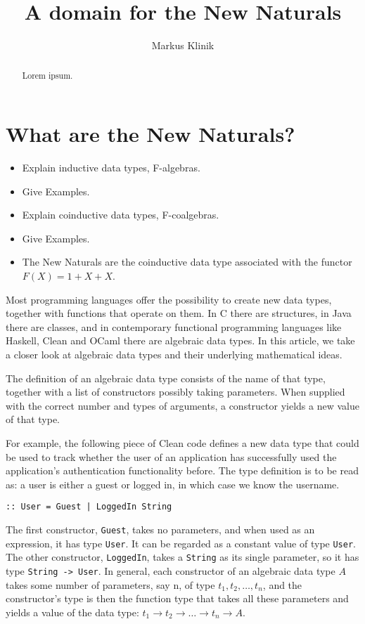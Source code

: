 \documentclass[a4paper]{article}
\newcommand{\arr}{\rightarrow}
\begin{document}
\title{A domain for the New Naturals}
\author{Markus Klinik}
\maketitle

\begin{abstract}
Lorem ipsum.
\end{abstract}

\section{What are the New Naturals?}

\begin{itemize}
\item Explain inductive data types, F-algebras.
\item Give Examples.
\item Explain coinductive data types, F-coalgebras.
\item Give Examples.
\item The New Naturals are the coinductive data type associated with the
functor $F(X) = 1 + X + X$.
\end{itemize}

Most programming languages offer the possibility to create new data types,
together with functions that operate on them.  In C there are structures, in
Java there are classes, and in contemporary functional programming languages
like Haskell, Clean and OCaml there are algebraic data types.  In this article,
we take a closer look at algebraic data types and their underlying mathematical
ideas.

The definition of an algebraic data type consists of the name of that type,
together with a list of constructors possibly taking parameters.  When supplied
with the correct number and types of arguments, a constructor yields a new
value of that type.

For example, the following piece of Clean code defines a new data type that
could be used to track whether the user of an application has successfully used
the application's authentication functionality before.  The type definition is
to be read as: a user is either a guest or logged in, in which case we know the
username.

\begin{verbatim}
:: User = Guest | LoggedIn String
\end{verbatim}

The first constructor, \verb+Guest+, takes no parameters, and when used as an
expression, it has type \verb+User+.  It can be regarded as a constant value of
type \verb+User+.  The other constructor, \verb+LoggedIn+, takes a
\verb+String+ as its single parameter, so it has type \verb+String -> User+.
In general, each constructor of an algebraic data type $A$ takes some number of
parameters, say n, of type $t_1, t_2, \ldots, t_n$, and the constructor's type
is then the function type that takes all these parameters and yields a value of
the data type: $t_1 \arr t_2 \arr \ldots \arr t_n \arr A$.
\end{document}
